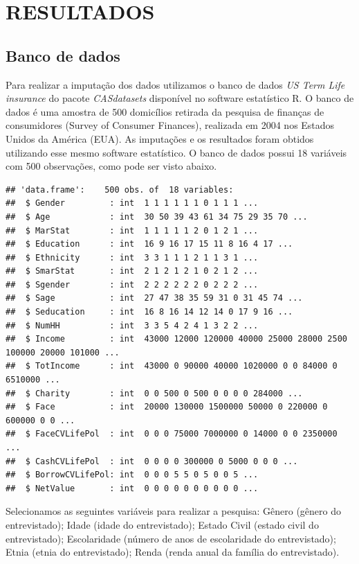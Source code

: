 \documentclass[]{article}
\begin{document}
\section{RESULTADOS}\label{resultados}

\subsection{Banco de dados}\label{banco-de-dados}

Para realizar a imputação dos dados utilizamos o banco de dados \emph{US
Term Life insurance} do pacote \emph{CASdatasets} disponível no software
estatístico R. O banco de dados é uma amostra de 500 domicílios retirada
da pesquisa de finanças de consumidores (Survey of Consumer Finances),
realizada em 2004 nos Estados Unidos da América (EUA). As imputações e
os resultados foram obtidos utilizando esse mesmo software estatístico.
O banco de dados possui 18 variáveis com 500 observações, como pode ser
visto abaixo.

\begin{verbatim}
## 'data.frame':    500 obs. of  18 variables:
##  $ Gender         : int  1 1 1 1 1 1 0 1 1 1 ...
##  $ Age            : int  30 50 39 43 61 34 75 29 35 70 ...
##  $ MarStat        : int  1 1 1 1 1 2 0 1 2 1 ...
##  $ Education      : int  16 9 16 17 15 11 8 16 4 17 ...
##  $ Ethnicity      : int  3 3 1 1 1 2 1 1 3 1 ...
##  $ SmarStat       : int  2 1 2 1 2 1 0 2 1 2 ...
##  $ Sgender        : int  2 2 2 2 2 2 0 2 2 2 ...
##  $ Sage           : int  27 47 38 35 59 31 0 31 45 74 ...
##  $ Seducation     : int  16 8 16 14 12 14 0 17 9 16 ...
##  $ NumHH          : int  3 3 5 4 2 4 1 3 2 2 ...
##  $ Income         : int  43000 12000 120000 40000 25000 28000 2500 100000 20000 101000 ...
##  $ TotIncome      : int  43000 0 90000 40000 1020000 0 0 84000 0 6510000 ...
##  $ Charity        : int  0 0 500 0 500 0 0 0 0 284000 ...
##  $ Face           : int  20000 130000 1500000 50000 0 220000 0 600000 0 0 ...
##  $ FaceCVLifePol  : int  0 0 0 75000 7000000 0 14000 0 0 2350000 ...
##  $ CashCVLifePol  : int  0 0 0 0 300000 0 5000 0 0 0 ...
##  $ BorrowCVLifePol: int  0 0 0 5 5 0 5 0 0 5 ...
##  $ NetValue       : int  0 0 0 0 0 0 0 0 0 0 ...
\end{verbatim}

Selecionamos as seguintes variáveis para realizar a pesquisa: Gênero
(gênero do entrevistado); Idade (idade do entrevistado); Estado Civil
(estado civil do entrevistado); Escolaridade (número de anos de
escolaridade do entrevistado); Etnia (etnia do entrevistado); Renda
(renda anual da família do entrevistado).
\end{document}
